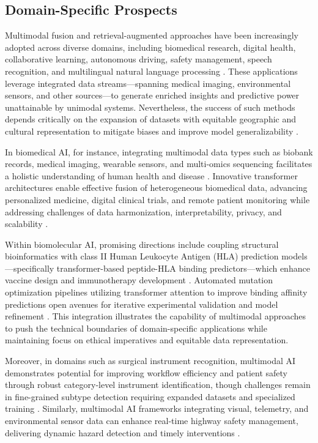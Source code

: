 \documentclass[sigconf]{acmart}
\begin{document}
\subsection{Domain-Specific Prospects}

Multimodal fusion and retrieval-augmented approaches have been increasingly adopted across diverse domains, including biomedical research, digital health, collaborative learning, autonomous driving, safety management, speech recognition, and multilingual natural language processing \cite{ref1,ref2,ref12,ref26,ref27,ref29,ref31,ref32}. These applications leverage integrated data streams—spanning medical imaging, environmental sensors, and other sources—to generate enriched insights and predictive power unattainable by unimodal systems. Nevertheless, the success of such methods depends critically on the expansion of datasets with equitable geographic and cultural representation to mitigate biases and improve model generalizability \cite{ref12,ref26,ref27,ref30}.

In biomedical AI, for instance, integrating multimodal data types such as biobank records, medical imaging, wearable sensors, and multi-omics sequencing facilitates a holistic understanding of human health and disease \cite{ref12}. Innovative transformer architectures enable effective fusion of heterogeneous biomedical data, advancing personalized medicine, digital clinical trials, and remote patient monitoring while addressing challenges of data harmonization, interpretability, privacy, and scalability \cite{ref12}. 

Within biomolecular AI, promising directions include coupling structural bioinformatics with class II Human Leukocyte Antigen (HLA) prediction models—specifically transformer-based peptide-HLA binding predictors—which enhance vaccine design and immunotherapy development \cite{ref19}. Automated mutation optimization pipelines utilizing transformer attention to improve binding affinity predictions open avenues for iterative experimental validation and model refinement \cite{ref19}. This integration illustrates the capability of multimodal approaches to push the technical boundaries of domain-specific applications while maintaining focus on ethical imperatives and equitable data representation.

Moreover, in domains such as surgical instrument recognition, multimodal AI demonstrates potential for improving workflow efficiency and patient safety through robust category-level instrument identification, though challenges remain in fine-grained subtype detection requiring expanded datasets and specialized training \cite{ref26}. Similarly, multimodal AI frameworks integrating visual, telemetry, and environmental sensor data can enhance real-time highway safety management, delivering dynamic hazard detection and timely interventions .
\end{document}
